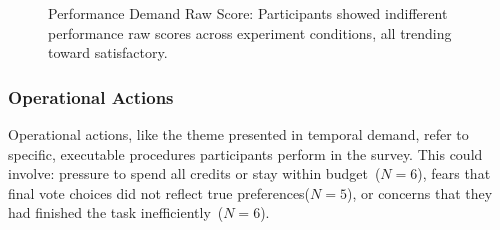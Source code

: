 \begin{figure} %
    \centering
    \captionsetup{width=0.9\linewidth, justification=justified}
    \caption{Performance Demand Raw Score: Participants showed indifferent performance raw scores across experiment conditions, all trending toward satisfactory.}

    \label{fig:performance_cog_score}
\end{figure}

\subsubsection{Operational Actions}
Operational actions, like the theme presented in temporal demand, refer to specific, executable procedures participants perform in the survey. This could involve: pressure to spend all credits or stay within budget~($N=6$), fears that final vote choices did not reflect true preferences($N=5$), or concerns that they had finished the task inefficiently~($N=6$).


